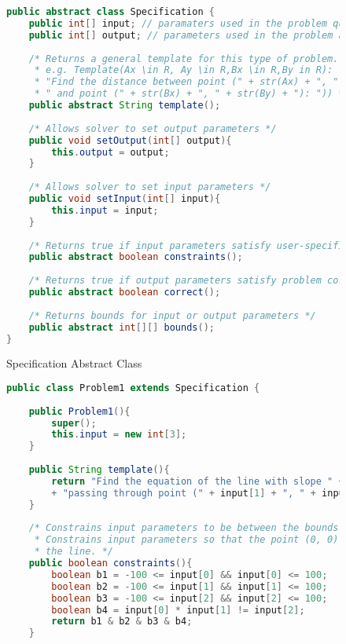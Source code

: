 \begin{singlespace}
\begin{figure}
\begin{lstlisting}[language=Java]
public abstract class Specification {
	public int[] input; // paramaters used in the problem question
	public int[] output; // parameters used in the problem answer
	
	/* Returns a general template for this type of problem.
	 * e.g. Template(Ax \in R, Ay \in R,Bx \in R,By in R): 
	 * "Find the distance between point (" + str(Ax) + ", " + str(Ay) + ")" + 
	 * " and point (" + str(Bx) + ", " + str(By) + "): ")) */
	public abstract String template();
	
	/* Allows solver to set output parameters */
	public void setOutput(int[] output){
		this.output = output;
	}
	
	/* Allows solver to set input parameters */
	public void setInput(int[] input){
		this.input = input;
	}
	
	/* Returns true if input parameters satisfy user-specified constraints */
	public abstract boolean constraints();
	
	/* Returns true if output parameters satisfy problem correctness */
	public abstract boolean correct();
	
	/* Returns bounds for input or output parameters */
	public abstract int[][] bounds();
}
\end{lstlisting}
\caption{Specification Abstract Class}
\label{fig:specification}
\end{figure}

\begin{figure}
\begin{lstlisting}[language=Java]
public class Problem1 extends Specification {
	
	public Problem1(){
		super();
		this.input = new int[3];
	}
	
	public String template(){
		return "Find the equation of the line with slope " + input[0] + " and "
		+ "passing through point (" + input[1] + ", " + input[2] + ")";
	}
	
	/* Constrains input parameters to be between the bounds -100 and 100.
	 * Constrains input parameters so that the point (0, 0) is not on
	 * the line. */
	public boolean constraints(){
		boolean b1 = -100 <= input[0] && input[0] <= 100;
		boolean b2 = -100 <= input[1] && input[1] <= 100;
		boolean b3 = -100 <= input[2] && input[2] <= 100;
		boolean b4 = input[0] * input[1] != input[2];
		return b1 & b2 & b3 & b4;
	}
	

\end{lstlisting}
\end{figure}
\end{singlespace}
